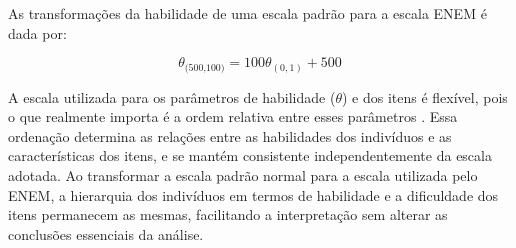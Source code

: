 As transformações da habilidade de uma escala padrão para a escala ENEM é dada por:


\[
	\theta_{\text{(500,100)}} = 100 \theta_{(0,1)} + 500
\]


\begin{comment}
\begin{itemize}
	
	\item Habilidade	
	
\item Dificuldade


\[
b_{\text{ENEM}} = 500 + 100 \times b_z 
\]

\item Discriminação

\[
a_{\text{ENEM}} = \frac{a_z}{100}
\]

\item Chute

\[
c_{\text{ENEM}} = c_z
\]

\end{itemize}
\end{comment}


A escala utilizada para os parâmetros de habilidade ($\theta$) e dos itens é flexível, pois o que realmente importa é a ordem relativa entre esses parâmetros \cite{de2000teoria}. Essa ordenação determina as relações entre as habilidades dos indivíduos e as características dos itens, e se mantém consistente independentemente da escala adotada. Ao transformar a escala padrão normal para a escala utilizada pelo ENEM, a hierarquia dos indivíduos em termos de habilidade e a dificuldade dos itens permanecem as mesmas, facilitando a interpretação sem alterar as conclusões essenciais da análise.

